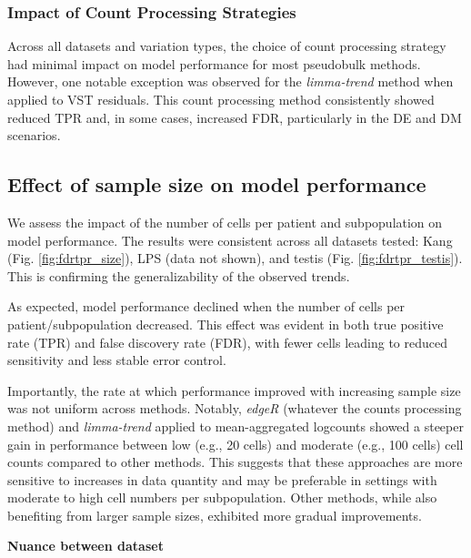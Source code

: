 \documentclass[a4paper, 11pt, twocolumn]{article}
\begin{document}
\begin{multicols}{2}
\subsubsection{Impact of Count Processing Strategies}
Across all datasets and variation types, the choice of count processing strategy had minimal impact on model performance for most pseudobulk methods. However, one notable exception was observed for the \textit{limma-trend} method when applied to VST residuals. This count processing method consistently showed reduced TPR and, in some cases, increased FDR, particularly in the DE and DM scenarios.

\subsection{Effect of sample size on model performance}

We assess the impact of the number of cells per patient and subpopulation on model performance. The results were consistent across all datasets tested: Kang (Fig. \ref{fig:fdrtpr_size}), LPS (data not shown), and testis (Fig. \ref{fig:fdrtpr_testis}). This is confirming the generalizability of the observed trends.

As expected, model performance declined when the number of cells per patient/subpopulation decreased. This effect was evident in both true positive rate (TPR) and false discovery rate (FDR), with fewer cells leading to reduced sensitivity and less stable error control.

Importantly, the rate at which performance improved with increasing sample size was not uniform across methods. Notably, \textit{edgeR} (whatever the counts processing method) and \textit{limma-trend} applied to mean-aggregated logcounts showed a steeper gain in performance between low (e.g., 20 cells) and moderate (e.g., 100 cells) cell counts compared to other methods. This suggests that these approaches are more sensitive to increases in data quantity and may be preferable in settings with moderate to high cell numbers per subpopulation. Other methods, while also benefiting from larger sample sizes, exhibited more gradual improvements.

\textbf{Nuance between dataset}

\end{multicols}
\end{document}
